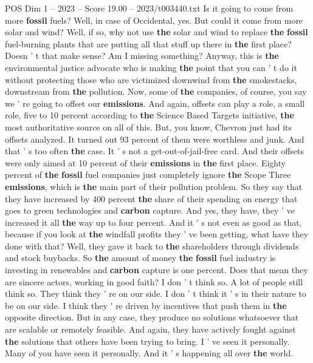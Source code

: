 \begin{textsample}{POS Dim 1 – 2023 – Score 19.00 – 2023/t003440.txt}
Is it going to come from more \textbf{fossil} fuels?
Well, in case of Occidental, yes.
But could it come from more solar and wind?
Well, if so, why not use \textbf{the} solar and wind to replace \textbf{the} \textbf{fossil} fuel-burning plants that are putting all that stuff up there in \textbf{the} first place?
Doesn ' t that make sense?
Am I missing something?
Anyway, this is \textbf{the} environmental justice advocate who is making \textbf{the} point that you can ' t do it without protecting those who are victimized downwind from \textbf{the} smokestacks, downstream from \textbf{the} pollution.
Now, some of \textbf{the} companies, of course, you say we ' re going to offset our \textbf{emissions}.
And again, offsets can play a role, a small role, five to 10 percent according to \textbf{the} Science Based Targets initiative, \textbf{the} most authoritative source on all of this.
But, you know, Chevron just had its offsets analyzed.
It turned out 93 percent of them were worthless and junk.
And that ' s too often \textbf{the} case.
It ' s not a get-out-of-jail-free card.
And their offsets were only aimed at 10 percent of their \textbf{emissions} in \textbf{the} first place.
Eighty percent of \textbf{the} \textbf{fossil} fuel companies just completely ignore \textbf{the} Scope Three \textbf{emissions}, which is \textbf{the} main part of their pollution problem.
So they say that they have increased by 400 percent \textbf{the} share of their spending on energy that goes to green technologies and \textbf{carbon} capture.
And yes, they have, they ' ve increased it all \textbf{the} way up to four percent.
And it ' s not even as good as that, because if you look at \textbf{the} windfall profits they ' ve been getting, what have they done with that?
Well, they gave it back to \textbf{the} shareholders through dividends and stock buybacks.
So \textbf{the} amount of money \textbf{the} \textbf{fossil} fuel industry is investing in renewables and \textbf{carbon} capture is one percent.
Does that mean they are sincere actors, working in good faith?
I don ' t think so.
A lot of people still think so.
They think they ' re on our side.
I don ' t think it ' s in their nature to be on our side.
I think they ' re driven by incentives that push them in \textbf{the} opposite direction.
But in any case, they produce no solutions whatsoever that are scalable or remotely feasible.
And again, they have actively fought against \textbf{the} solutions that others have been trying to bring.
I ' ve seen it personally.
Many of you have seen it personally.
And it ' s happening all over \textbf{the} world.

\end{textsample}
